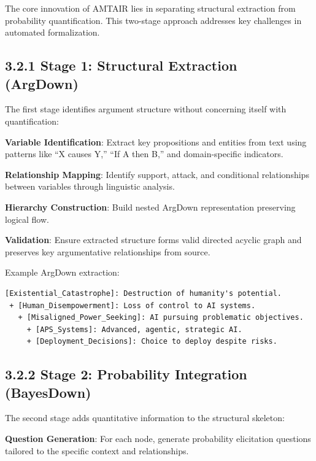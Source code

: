 \documentclass[
  11pt,
  letterpaper,
]{book}
\begin{document}

The core innovation of AMTAIR lies in separating structural extraction
from probability quantification. This two-stage approach addresses key
challenges in automated formalization.

\subsection*{3.2.1 Stage 1: Structural Extraction
(ArgDown)}\label{sec-stage1-argdown}

The first stage identifies argument structure without concerning itself
with quantification:

\textbf{Variable Identification}: Extract key propositions and entities
from text using patterns like ``X causes Y,'' ``If A then B,'' and
domain-specific indicators.

\textbf{Relationship Mapping}: Identify support, attack, and conditional
relationships between variables through linguistic analysis.

\textbf{Hierarchy Construction}: Build nested ArgDown representation
preserving logical flow.

\textbf{Validation}: Ensure extracted structure forms valid directed
acyclic graph and preserves key argumentative relationships from source.

Example ArgDown extraction:

\begin{verbatim}
[Existential_Catastrophe]: Destruction of humanity's potential.
 + [Human_Disempowerment]: Loss of control to AI systems.
   + [Misaligned_Power_Seeking]: AI pursuing problematic objectives.
     + [APS_Systems]: Advanced, agentic, strategic AI.
     + [Deployment_Decisions]: Choice to deploy despite risks.
\end{verbatim}

\subsection*{3.2.2 Stage 2: Probability Integration
(BayesDown)}\label{sec-stage2-bayesdown}

The second stage adds quantitative information to the structural
skeleton:

\textbf{Question Generation}: For each node, generate probability
elicitation questions tailored to the specific context and
relationships.
\end{document}
